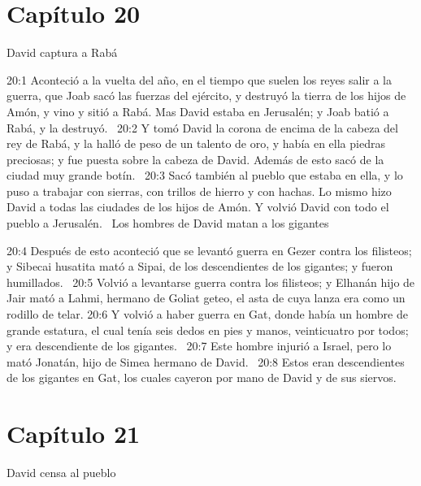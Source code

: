 \section*{Capítulo 20 }
David captura a Rabá  


20:1 Aconteció a la vuelta del año, en el tiempo que suelen los reyes salir a la guerra, que Joab sacó las fuerzas del ejército, y destruyó la tierra de los hijos de Amón, y vino y sitió a Rabá. Mas David estaba en Jerusalén; y Joab batió a Rabá, y la destruyó.  
20:2 Y tomó David la corona de encima de la cabeza del rey de Rabá, y la halló de peso de un talento de oro, y había en ella piedras preciosas; y fue puesta sobre la cabeza de David. Además de esto sacó de la ciudad muy grande botín.  
20:3 Sacó también al pueblo que estaba en ella, y lo puso a trabajar con sierras, con trillos de hierro y con hachas. Lo mismo hizo David a todas las ciudades de los hijos de Amón. Y volvió David con todo el pueblo a Jerusalén.  
Los hombres de David matan a los gigantes  

20:4 Después de esto aconteció que se levantó guerra en Gezer contra los filisteos; y Sibecai husatita mató a Sipai, de los descendientes de los gigantes; y fueron humillados.  
20:5 Volvió a levantarse guerra contra los filisteos; y Elhanán hijo de Jair mató a Lahmi, hermano de Goliat geteo, el asta de cuya lanza era como un rodillo de telar. 
20:6 Y volvió a haber guerra en Gat, donde había un hombre de grande estatura, el cual tenía seis dedos en pies y manos, veinticuatro por todos; y era descendiente de los gigantes.  
20:7 Este hombre injurió a Israel, pero lo mató Jonatán, hijo de Simea hermano de David.  
20:8 Estos eran descendientes de los gigantes en Gat, los cuales cayeron por mano de David y de sus siervos.  
\section*{Capítulo 21}
David censa al pueblo 



